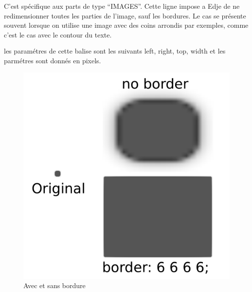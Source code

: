\documentclass[a4paper]{efr}
\begin{document}
C'est spécifique aux parts de type ``IMAGES''. Cette ligne impose a Edje de ne
redimensionner toutes les parties de l'image, sauf les bordures. Le cas se
présente souvent lorsque on utilise une image avec des coins arrondis par
exemples, comme c'est le cas avec le contour du texte.

les paramétres de cette balise sont les suivants left, right, top, width et les
parmétres sont donnés en pixels.

\begin{figure}
  \begin{center}
    \includegraphics[scale=0.5]{images/border_diff.pdf}
  \end{center}
  \caption{Avec et sans bordure}
\end{figure}
\end{document}
